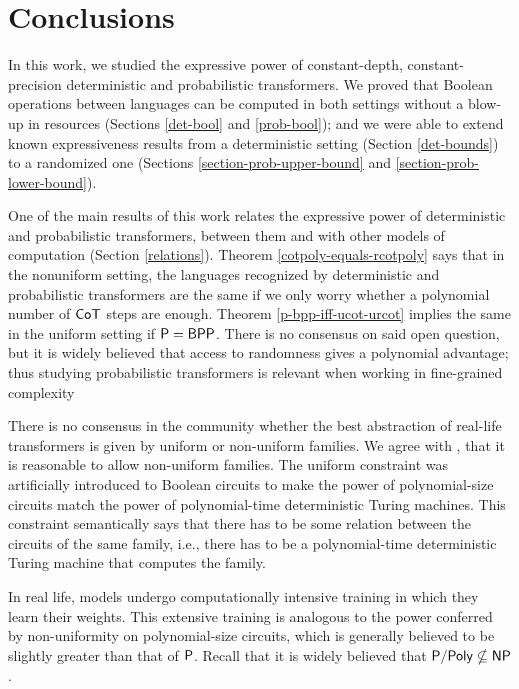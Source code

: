 \chapter{Conclusions}

In this work, we studied the expressive power of constant-depth, constant-precision deterministic and probabilistic transformers.
We proved that Boolean operations between languages can be computed in both settings without a blow-up in resources (Sections \ref{det-bool} and \ref{prob-bool}); and we were able to extend known expressiveness results from a deterministic setting (Section \ref{det-bounds}) to a randomized one (Sections \ref{section-prob-upper-bound} and \ref{section-prob-lower-bound}).

\smallskip

One of the main results of this work relates the expressive power of deterministic and probabilistic transformers, between them and with other models of computation (Section \ref{relations}).
Theorem \ref{cotpoly-equals-rcotpoly} says that in the nonuniform setting, the languages recognized by deterministic and probabilistic transformers are the same if we only worry whether a polynomial number of $\mathsf{CoT}$ steps are enough.
Theorem \ref{p-bpp-iff-ucot-urcot} implies the same in the uniform setting if $\mathsf{P} = \mathsf{BPP}$.
There is no consensus on said open question, but it is widely believed that access to randomness gives a polynomial advantage; thus studying probabilistic transformers is relevant when working in fine-grained complexity

\smallskip

There is no consensus in the community whether the best abstraction of real-life transformers is given by uniform or non-uniform families.
We agree with \citet{fortnow2025nonuniform}, that it is reasonable to allow non-uniform families.
The uniform constraint was artificially introduced to Boolean circuits to make the power of polynomial-size circuits match the power of polynomial-time deterministic Turing machines.
This constraint semantically says that there has to be some relation between the circuits of the same family, i.e., there has to be a polynomial-time deterministic Turing machine that computes the family.

In real life, models undergo computationally intensive training in which they learn their weights.
This extensive training is analogous to the power conferred by non-uniformity on polynomial-size circuits, which is generally believed to be slightly greater than that of $\mathsf{P}$.
Recall that it is widely believed that $\mathsf{P/Poly} \nsubseteq \mathsf{NP}$.

